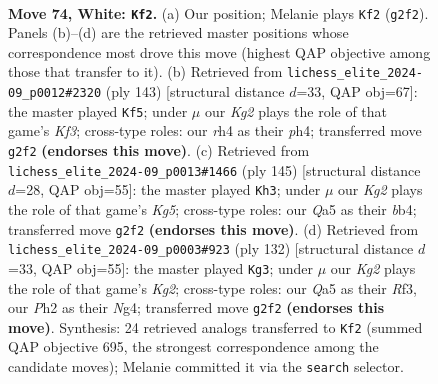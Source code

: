 \documentclass[11pt]{article}
\begin{document}
\clearpage

\begin{figure}[p]\centering
\begin{subfigure}{0.46\textwidth}\centering
\resizebox{\linewidth}{!}{%
\newchessgame
\chessboard[
  setfen={8/1q5k/5p2/Q7/7r/6P1/6KP/8 w - - 3 74},
  showmover=false,
  pgfstyle=straightmove, color=movearrow, markmove={g2-f2}
]}
\caption{}
\end{subfigure}\hfill
\begin{subfigure}{0.46\textwidth}\centering
\resizebox{\linewidth}{!}{%
\newchessgame
\chessboard[
  setfen={8/8/5kp1/7p/7P/6q1/4K3/Q7 b - - 1 72},
  showmover=false,
  pgfstyle=straightmove, color=movearrow, markmove={f6-f5}
]}
\caption{}
\end{subfigure}
\\[4pt]
\begin{subfigure}{0.46\textwidth}\centering
\resizebox{\linewidth}{!}{%
\newchessgame
\chessboard[
  setfen={6Q1/8/7p/1K1R4/1B3pkP/8/8/8 b - - 1 73},
  showmover=false,
  pgfstyle=straightmove, color=movearrow, markmove={g4-h3}
]}
\caption{}
\end{subfigure}\hfill
\begin{subfigure}{0.46\textwidth}\centering
\resizebox{\linewidth}{!}{%
\newchessgame
\chessboard[
  setfen={8/8/kp6/8/r5N1/5R1P/2q3K1/8 w - - 3 67},
  showmover=false,
  pgfstyle=straightmove, color=movearrow, markmove={g2-g3}
]}
\caption{}
\end{subfigure}
\caption{\textbf{Move 74, White: \texttt{Kf2}.} (a) Our position; Melanie plays \texttt{Kf2} (\texttt{g2f2}). Panels (b)--(d) are the retrieved master positions whose correspondence most drove this move (highest QAP objective among those that transfer to it). (b) Retrieved from \texttt{lichess\_elite\_2024-09\_p0012\#2320} (ply 143) [structural distance $d$=33, QAP obj=67]: the master played \texttt{Kf5}; under $\mu$ our \emph{Kg2} plays the role of that game's \emph{Kf3}; cross-type roles: our \emph{r}h4 as their \emph{p}h4; transferred move \texttt{g2f2} \textbf{(endorses this move)}. (c) Retrieved from \texttt{lichess\_elite\_2024-09\_p0013\#1466} (ply 145) [structural distance $d$=28, QAP obj=55]: the master played \texttt{Kh3}; under $\mu$ our \emph{Kg2} plays the role of that game's \emph{Kg5}; cross-type roles: our \emph{Q}a5 as their \emph{b}b4; transferred move \texttt{g2f2} \textbf{(endorses this move)}. (d) Retrieved from \texttt{lichess\_elite\_2024-09\_p0003\#923} (ply 132) [structural distance $d$=33, QAP obj=55]: the master played \texttt{Kg3}; under $\mu$ our \emph{Kg2} plays the role of that game's \emph{Kg2}; cross-type roles: our \emph{Q}a5 as their \emph{R}f3, our \emph{P}h2 as their \emph{N}g4; transferred move \texttt{g2f2} \textbf{(endorses this move)}. Synthesis: 24 retrieved analogs transferred to \texttt{Kf2} (summed QAP objective 695, the strongest correspondence among the candidate moves); Melanie committed it via the \texttt{search} selector.}
\label{fig:thought-m146}
\end{figure}
\end{document}
